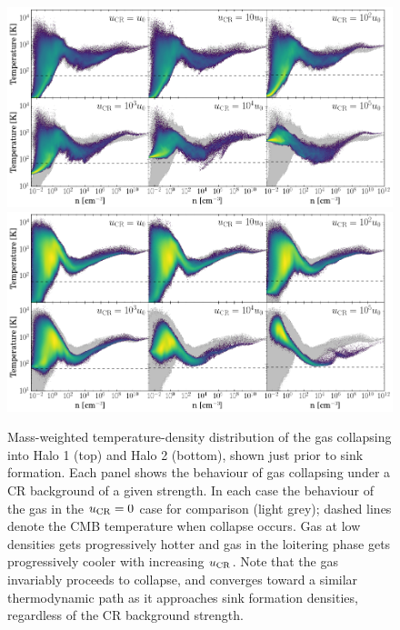 \documentclass[usenatbib]{mn2e}
\newcommand{\ucr}{{u}_{\rm \small CR}}
\begin{document}
\begin{figure}
\begin{center}
\includegraphics[width=1\textwidth]{figures/temp/temp}
\includegraphics[width=1\textwidth]{figures/temp/temp_halo2}
\caption{\label{fig:temp}
Mass-weighted temperature-density distribution of the gas collapsing into Halo 1 (top) and Halo 2 (bottom), shown just prior to sink formation. 
Each panel shows the behaviour of gas collapsing under a CR background of a given strength. 
In each case the behaviour of the gas in the $\ucr=0$ case for comparison (light grey); dashed lines denote the CMB temperature when collapse occurs. Gas at low densities gets progressively hotter and gas in the loitering phase gets progressively cooler with increasing $\ucr$. 
Note that the gas invariably proceeds to collapse, and converges toward a similar thermodynamic path as it approaches sink formation densities, regardless of the CR background strength.%
}
\end{center}
\end{figure}
\end{document}
